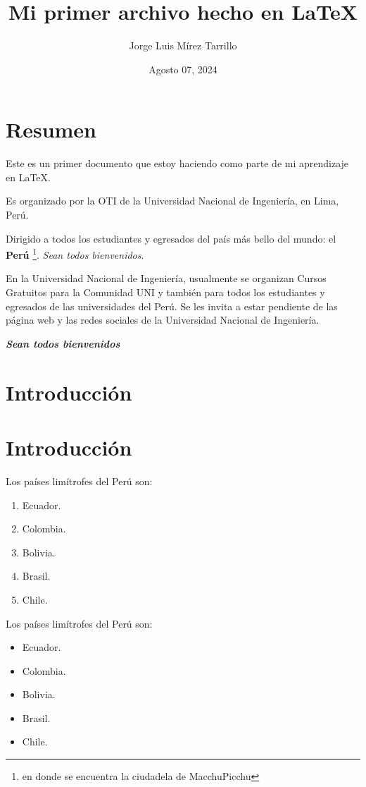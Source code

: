 \documentclass{article}
\title{Mi primer archivo hecho en LaTeX}
\author{Jorge Luis Mírez Tarrillo}
\date{Agosto 07, 2024}
\begin{document}
\maketitle

\section*{Resumen}
Este es un primer documento que estoy haciendo como parte de mi aprendizaje en LaTeX.

Es organizado por la OTI de la Universidad Nacional de Ingeniería, en Lima, Perú.

Dirigido a todos los estudiantes y egresados del país más bello del mundo: el \textbf{Perú} \footnote{en donde se encuentra la ciudadela de MacchuPicchu}. \textit{Sean todos bienvenidos}.

\begin{multicols}{2}
    En la Universidad Nacional de Ingeniería, usualmente se organizan Cursos Gratuitos para la Comunidad UNI y también para todos los estudiantes y egresados de las universidades del Perú. Se les invita a estar pendiente de las página web y las redes sociales de la Universidad Nacional de Ingeniería.
\end{multicols}

\textbf{\textit{Sean todos bienvenidos}}


\section*{Introducci\'on}

\section{Introducci\'on}
Los países limítrofes del Perú son:
\begin{enumerate}
    \item Ecuador.
    \item Colombia.
    \item Bolivia.
    \item Brasil.
    \item Chile.
\end{enumerate}

Los países limítrofes del Perú son:
\begin{itemize}
    \item Ecuador.
    \item Colombia.
    \item Bolivia.
    \item Brasil.
    \item Chile.
\end{itemize}
\end{document}
